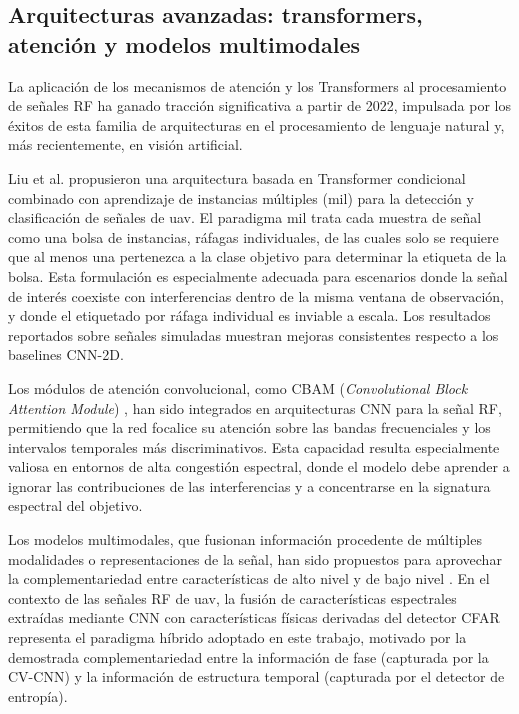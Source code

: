 \subsection{Arquitecturas avanzadas: transformers, atención y modelos multimodales}
\label{subsec:arquitecturas_avanzadas}

La aplicación de los mecanismos de atención y los Transformers al procesamiento de
señales RF ha ganado tracción significativa a partir de 2022, impulsada por los
éxitos de esta familia de arquitecturas en el procesamiento de lenguaje natural y,
más recientemente, en visión artificial.

Liu et al. \cite{liu_transformer-based_2025} propusieron una arquitectura basada en
Transformer condicional combinado con aprendizaje de instancias múltiples (\gls{mil})
para la detección y clasificación de señales de \gls{uav}. El paradigma \gls{mil} trata
cada muestra de señal como una bolsa de instancias, ráfagas individuales, de las
cuales solo se requiere que al menos una pertenezca a la clase objetivo para
determinar la etiqueta de la bolsa. Esta formulación es especialmente adecuada para
escenarios donde la señal de interés coexiste con interferencias dentro de la misma
ventana de observación, y donde el etiquetado por ráfaga individual es inviable a
escala. Los resultados reportados sobre señales simuladas muestran mejoras
consistentes respecto a los baselines CNN-2D.

Los módulos de atención convolucional, como CBAM (\textit{Convolutional Block
Attention Module}) \cite{woo_cbam_2018}, han sido integrados en arquitecturas CNN
para la señal RF, permitiendo que la red focalice su atención sobre las bandas
frecuenciales y los intervalos temporales más discriminativos. Esta capacidad
resulta especialmente valiosa en entornos de alta congestión espectral, donde el
modelo debe aprender a ignorar las contribuciones de las interferencias y a
concentrarse en la signatura espectral del objetivo.

Los modelos multimodales, que fusionan información procedente de múltiples
modalidades o representaciones de la señal, han sido propuestos para aprovechar la
complementariedad entre características de alto nivel y de bajo nivel
\cite{baltrusaitis_multimodal_2018}. En el contexto de las señales RF de \gls{uav},
la fusión de características espectrales extraídas mediante CNN con características
físicas derivadas del detector CFAR representa el paradigma híbrido adoptado en
este trabajo, motivado por la demostrada complementariedad entre la información
de fase (capturada por la CV-CNN) y la información de estructura temporal
(capturada por el detector de entropía).

